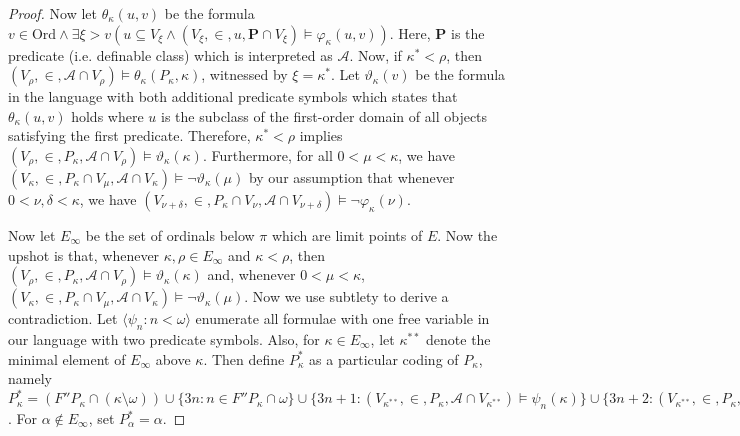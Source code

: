 \documentclass{article}
\newcommand{\Ord}{\mathrm{Ord}}
\theoremstyle{definition}
\theoremstyle{plain}
\theoremstyle{plain}
\theoremstyle{plain}
\theoremstyle{plain}
\theoremstyle{remark}
\theoremstyle{remark}
\theoremstyle{remark}
\theoremstyle{plain}
\theoremstyle{plain}
\theoremstyle{plain}
\begin{document}
\begin{proof}
Now let $\theta_\kappa(u, v)$ be the formula $v \in \Ord \land \exists \xi > v (u \subseteq V_\xi \land (V_\xi, \in, u, \mathbf{P} \cap V_\xi) \models \varphi_\kappa(u, v))$. Here, $\mathbf{P}$ is the predicate (i.e. definable class) which is interpreted as $\mathcal{A}$. Now, if $\kappa^* < \rho$, then $(V_\rho, \in, \mathcal{A} \cap V_\rho) \models \theta_\kappa(P_\kappa, \kappa)$, witnessed by $\xi = \kappa^*$. Let $\vartheta_\kappa(v)$ be the formula in the language with both additional predicate symbols which states that $\theta_\kappa(u, v)$ holds where $u$ is the subclass of the first-order domain of all objects satisfying the first predicate. Therefore, $\kappa^* < \rho$ implies $(V_\rho, \in, P_\kappa, \mathcal{A} \cap V_\rho) \models \vartheta_\kappa(\kappa)$. Furthermore, for all $0 < \mu < \kappa$, we have $(V_\kappa, \in, P_\kappa \cap V_\mu, \mathcal{A} \cap V_\kappa) \models \neg \vartheta_\kappa(\mu)$ by our assumption that whenever $0 < \nu, \delta < \kappa$, we have $(V_{\nu+\delta}, \in, P_\kappa \cap V_\nu, \mathcal{A} \cap V_{\nu+\delta}) \models \neg \varphi_\kappa(\nu)$.

Now let $E_\infty$ be the set of ordinals below $\pi$ which are limit points of $E$. Now the upshot is that, whenever $\kappa, \rho \in E_\infty$ and $\kappa < \rho$, then $(V_\rho, \in, P_\kappa, \mathcal{A} \cap V_\rho) \models \vartheta_\kappa(\kappa)$ and, whenever $0 < \mu < \kappa$, $(V_\kappa, \in, P_\kappa \cap V_\mu, \mathcal{A} \cap V_\kappa) \models \neg \vartheta_\kappa(\mu)$. Now we use subtlety to derive a contradiction. Let $\langle \psi_n: n < \omega \rangle$ enumerate all formulae with one free variable in our language with two predicate symbols. Also, for $\kappa \in E_\infty$, let $\kappa^{**}$ denote the minimal element of $E_\infty$ above $\kappa$. Then define $P_\kappa^*$ as a particular coding of $P_\kappa$, namely $P_\kappa^* = (F''P_\kappa \cap (\kappa \setminus \omega)) \cup \{3n: n \in F''P_\kappa \cap \omega\} \cup \{3n+1: (V_{\kappa^{**}}, \in, P_\kappa, \mathcal{A} \cap V_{\kappa^{**}}) \models \psi_n(\kappa)\} \cup \{3n+2: (V_{\kappa^{**}}, \in, P_\kappa, \mathcal{A} \cap V_{\kappa^{**}}) \models \neg \psi_n(\kappa)\}$. For $\alpha \notin E_\infty$, set $P_\alpha^* = \alpha$. 


\end{proof}
\end{document}
